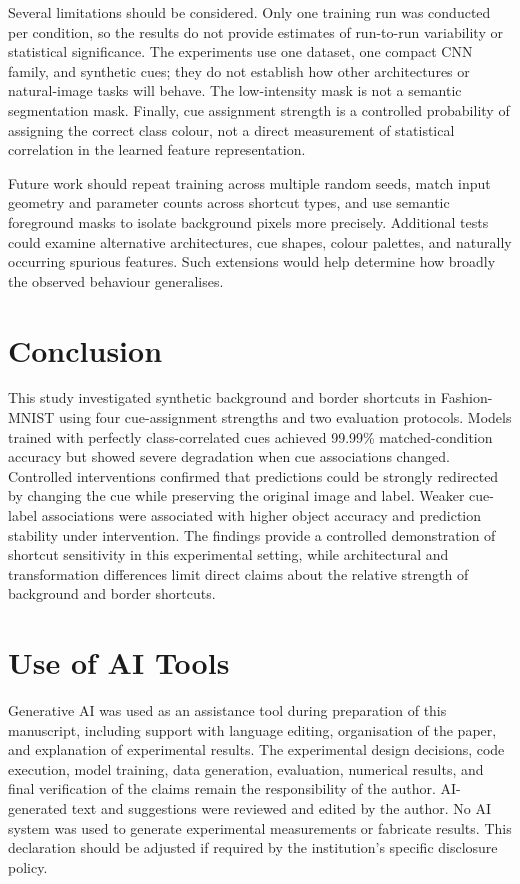 \documentclass[conference]{IEEEtran}
\begin{document}
Several limitations should be considered. Only one training run was conducted per condition, so the results do not provide estimates of run-to-run variability or statistical significance. The experiments use one dataset, one compact CNN family, and synthetic cues; they do not establish how other architectures or natural-image tasks will behave. The low-intensity mask is not a semantic segmentation mask. Finally, cue assignment strength is a controlled probability of assigning the correct class colour, not a direct measurement of statistical correlation in the learned feature representation.

Future work should repeat training across multiple random seeds, match input geometry and parameter counts across shortcut types, and use semantic foreground masks to isolate background pixels more precisely. Additional tests could examine alternative architectures, cue shapes, colour palettes, and naturally occurring spurious features. Such extensions would help determine how broadly the observed behaviour generalises.

\section{Conclusion}
This study investigated synthetic background and border shortcuts in Fashion-MNIST using four cue-assignment strengths and two evaluation protocols. Models trained with perfectly class-correlated cues achieved 99.99\% matched-condition accuracy but showed severe degradation when cue associations changed. Controlled interventions confirmed that predictions could be strongly redirected by changing the cue while preserving the original image and label. Weaker cue-label associations were associated with higher object accuracy and prediction stability under intervention. The findings provide a controlled demonstration of shortcut sensitivity in this experimental setting, while architectural and transformation differences limit direct claims about the relative strength of background and border shortcuts.

\section*{Use of AI Tools}
Generative AI was used as an assistance tool during preparation of this manuscript, including support with language editing, organisation of the paper, and explanation of experimental results. The experimental design decisions, code execution, model training, data generation, evaluation, numerical results, and final verification of the claims remain the responsibility of the author. AI-generated text and suggestions were reviewed and edited by the author. No AI system was used to generate experimental measurements or fabricate results. This declaration should be adjusted if required by the institution's specific disclosure policy.
\end{document}
